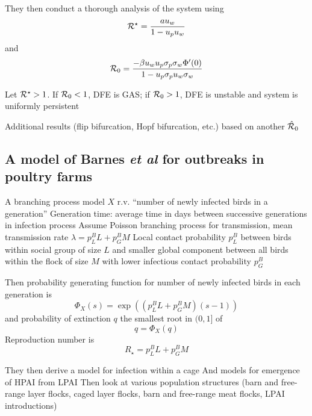 \documentclass[aspectratio=43]{beamer}
\begin{document}
\begin{frame}
  They then conduct a thorough analysis of the system using 
  \[
    \mathcal{R}^\star = \frac{au_w}{1-u_pu_w}
  \]
  and
  \[
    \mathcal{R}_0=\frac{-\beta u_wu_p\sigma_p\sigma_w\Phi'(0)}{1-u_p\sigma_pu_w\sigma_w}
  \]
  \vfill
  \begin{proposition}
    Let $\mathcal{R}^\star>1$. If $\mathcal{R}_0<1$, DFE is GAS; if $\mathcal{R}_0>1$, DFE is unstable and system is uniformly persistent
  \end{proposition}
  Additional results (flip bifurcation, Hopf bifurcation, etc.) based on another $\hat{\mathcal{R}}_0$
\end{frame}



\subsection{A model of Barnes \emph{et al} for outbreaks in poultry farms}

\begin{frame}{A branching process model}
  $X$ r.v. ``number of newly infected birds in a generation''
  \vfill
  Generation time: average time in days between successive generations in infection process
  \vfill
  Assume Poisson branching process for transmission, mean transmission rate $\lambda=p_L^BL+p_G^BM$
  \vfill
  Local contact probability $p_L^B$ between birds within social group of size $L$ and smaller global component between all birds within the flock of size $M$ with lower infectious contact probability $p_G^B$
\end{frame}

\begin{frame}
  Then probability generating function for number of newly infected birds in each generation is
  \[
    \Phi_X(s)=\exp\left(
      (p_L^BL+p_G^BM)(s-1)
    \right)
  \]
  and probability of extinction $q$ the smallest root in $(0,1]$ of
  \[
    q=\Phi_X(q)
  \]
  \vfill
  Reproduction number is
  \[
    R_\star = p_L^BL+p_G^BM
  \]
\end{frame}

\begin{frame}
  They then derive a model for infection within a cage
  \vfill
  And models for emergence of HPAI from LPAI
  \vfill
  Then look at various population structures (barn and free-range layer flocks, caged layer flocks, barn and free-range meat flocks, LPAI introductions)
\end{frame}
\end{document}
